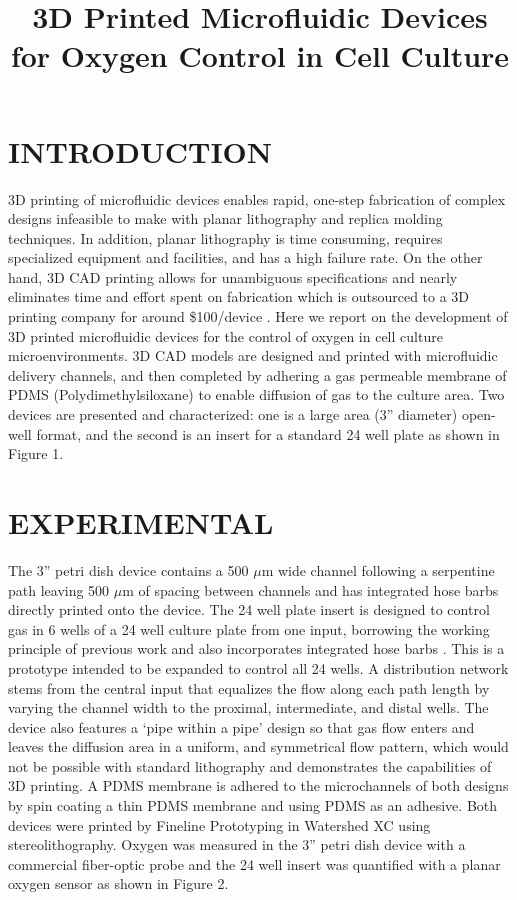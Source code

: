 \documentclass{article}
\title{3D Printed Microfluidic Devices for Oxygen Control in Cell Culture}
\begin{document}
\maketitle

\section{INTRODUCTION}

3D printing of microfluidic devices enables rapid, one-step fabrication of complex designs infeasible to make with planar lithography and replica molding techniques.
In addition, planar lithography is time consuming, requires specialized equipment and facilities, and has a high failure rate.
On the other hand, 3D CAD printing allows for unambiguous specifications and nearly eliminates time and effort spent on fabrication which is outsourced to a 3D printing company for around \$100/device \cite{Au2014,Chen2014}.
Here we report on the development of 3D printed microfluidic devices for the control of oxygen in cell culture microenvironments.
3D CAD models are designed and printed with microfluidic delivery channels, and then completed by adhering a gas permeable membrane of PDMS (Polydimethylsiloxane) to enable diffusion of gas to the culture area.
Two devices are presented and characterized: one is a large area (3” diameter) open-well format, and the second is an insert for a standard 24 well plate as shown in Figure 1. 

\section{EXPERIMENTAL}

The 3” petri dish device contains a 500 $\mu$m wide channel following a serpentine path leaving 500 $\mu$m of spacing between channels and has integrated hose barbs directly printed onto the device.
The 24 well plate insert is designed to control gas in 6 wells of a 24 well culture plate from one input, borrowing the working principle of previous work and also incorporates integrated hose barbs \cite{Oppegard2010}.
This is a prototype intended to be expanded to control all 24 wells.
A distribution network stems from the central input that equalizes the flow along each path length by varying the channel width to the proximal, intermediate, and distal wells.
The device also features a ‘pipe within a pipe’ design so that gas flow enters and leaves the diffusion area in a uniform, and symmetrical flow pattern, which would not be possible with standard lithography and demonstrates the capabilities of 3D printing.
A PDMS membrane is adhered to the microchannels of both designs by spin coating a thin PDMS membrane and using PDMS as an adhesive.
Both devices were printed by Fineline Prototyping in Watershed XC using stereolithography.
Oxygen was measured in the 3” petri dish device with a commercial fiber-optic probe and the 24 well insert was quantified with a planar oxygen sensor as shown in Figure 2. 
\end{document}
